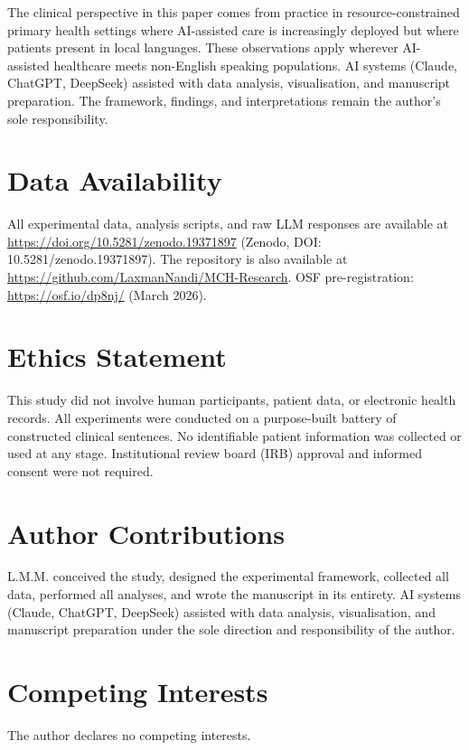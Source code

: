 \documentclass[11pt,a4paper]{article}
\begin{document}
The clinical perspective in this paper comes from practice in resource-constrained primary health settings where AI-assisted care is increasingly deployed but where patients present in local languages. These observations apply wherever AI-assisted healthcare meets non-English speaking populations. AI systems (Claude, ChatGPT, DeepSeek) assisted with data analysis, visualisation, and manuscript preparation. The framework, findings, and interpretations remain the author's sole responsibility.

\section*{Data Availability}

All experimental data, analysis scripts, and raw LLM responses are available at \url{https://doi.org/10.5281/zenodo.19371897} (Zenodo, DOI: 10.5281/zenodo.19371897). The repository is also available at \url{https://github.com/LaxmanNandi/MCH-Research}. OSF pre-registration: \url{https://osf.io/dp8nj/} (March 2026).

\section*{Ethics Statement}

This study did not involve human participants, patient data, or electronic health records. All experiments were conducted on a purpose-built battery of constructed clinical sentences. No identifiable patient information was collected or used at any stage. Institutional review board (IRB) approval and informed consent were not required.

\section*{Author Contributions}
L.M.M. conceived the study, designed the experimental framework, collected all data, performed all analyses, and wrote the manuscript in its entirety. AI systems (Claude, ChatGPT, DeepSeek) assisted with data analysis, visualisation, and manuscript preparation under the sole direction and responsibility of the author.

\section*{Competing Interests}
The author declares no competing interests.
\end{document}

